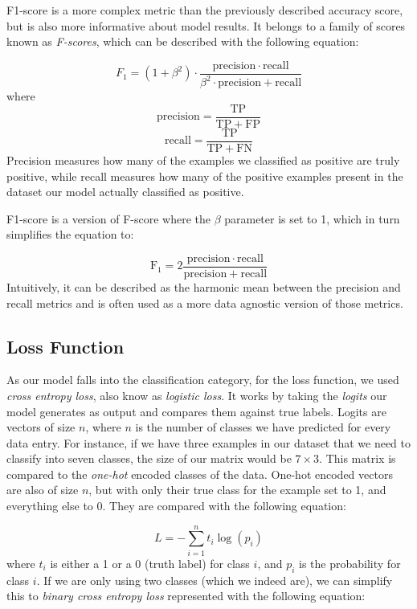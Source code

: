 \documentclass[times, utf8, diplomski, english]{fer_eng}
\begin{document}
F1-score is a more complex metric than the previously described accuracy score, but is also more informative about model results. It belongs to a family of scores known as \textit{F-scores}, which can be described with the following equation:

\[ F_1 = (1 + \beta^2) \cdot \frac{\mathrm{precision} \cdot \mathrm{recall}}{\beta^2 \cdot \mathrm{precision} + \mathrm{recall}} \] where \[ \mathrm{precision} = \frac{\mathrm{TP}}{\mathrm{TP} + \mathrm{FP}} \] \[ \mathrm{recall} = \frac{\mathrm{TP}}{\mathrm{TP} + \mathrm{FN}} \]
Precision measures how many of the examples we classified as positive are truly positive, while recall measures how many of the positive examples present in the dataset our model actually classified as positive.

F1-score is a version of F-score where the $\beta$ parameter is set to 1, which in turn simplifies the equation to:

\[ \mathrm{F_1} = 2 \frac{\mathrm{precision} \cdot \mathrm{recall}}{\mathrm{precision} + \mathrm{recall}} \]
Intuitively, it can be described as the harmonic mean between the precision and recall metrics and is often used as a more data agnostic version of those metrics.

\subsection{Loss Function}
\label{subsec:loss function}

As our model falls into the classification category, for the loss function, we used \textit{cross entropy loss}, also know as \textit{logistic loss}. It works by taking the \textit{logits} our model generates as output and compares them against true labels. Logits are vectors of size $n$, where $n$ is the number of classes we have predicted for every data entry. For instance, if we have three examples in our dataset that we need to classify into seven classes, the size of our matrix would be $7 \times 3$. This matrix is compared to the \textit{one-hot} encoded classes of the data. One-hot encoded vectors are also of size $n$, but with only their true class for the example set to 1, and everything else to 0. They are compared with the following equation:

\[ L = - \sum_{i = 1}^n t_i \log (p_i) \]
where $t_i$ is either a 1 or a 0 (truth label) for class $i$, and $p_i$ is the probability for class $i$. If we are only using two classes (which we indeed are), we can simplify this to \textit{binary cross entropy loss} represented with the following equation:
\end{document}
